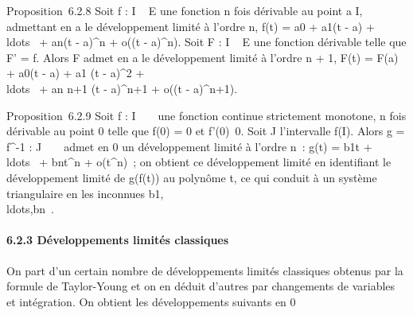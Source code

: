 Proposition~6.2.8 Soit f : I \rightarrow~ E une fonction n fois dérivable au point
a \in I, admettant en a le développement limité à l'ordre n, f(t) =
a0 + a1(t - a) +
\\ldots~ +
an(t - a)^n + o((t - a)^n). Soit F : I \rightarrow~
E une fonction dérivable telle que F' = f. Alors F admet en a le
développement limité à l'ordre n + 1, F(t) = F(a) + a0(t - a)
+ a1  (t - a)^2 +
\\ldots~ +
an \over n+1 (t - a)^n+1 + o((t
- a)^n+1).

Proposition~6.2.9 Soit f : I \rightarrow~ ~ une fonction continue strictement
monotone, n fois dérivable au point 0 telle que f(0) = 0 et
f'(0)\neq~0. Soit J l'intervalle f(I). Alors g =
f^-1 : J \rightarrow~ ~ admet en 0 un développement limité à l'ordre n~:
g(t) = b1t +
\\ldots~ +
bnt^n + o(t^n)~; on obtient ce
développement limité en identifiant le développement limité de g(f(t))
au polynôme t, ce qui conduit à un système triangulaire en les inconnues
b1,\\ldots,bn~.

\paragraph{6.2.3 Développements limités classiques}

On part d'un certain nombre de développements limités classiques obtenus
par la formule de Taylor-Young et on en déduit d'autres par changements
de variables et intégration. On obtient les développements suivants en 0


